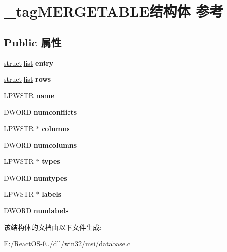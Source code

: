 \hypertarget{struct__tag_m_e_r_g_e_t_a_b_l_e}{}\section{\+\_\+tag\+M\+E\+R\+G\+E\+T\+A\+B\+L\+E结构体 参考}
\label{struct__tag_m_e_r_g_e_t_a_b_l_e}
\subsection*{Public 属性}
\begin{DoxyCompactItemize}
\item 
\mbox{\label{struct__tag_m_e_r_g_e_t_a_b_l_e_aa11b44de08a21772df241dfccb3161c1}} 
\hyperlink{interfacestruct}{struct} \hyperlink{classlist}{list} {\bfseries entry}
\item 
\mbox{\label{struct__tag_m_e_r_g_e_t_a_b_l_e_a0b328c20075d34b687b4c1938c43bcc1}} 
\hyperlink{interfacestruct}{struct} \hyperlink{classlist}{list} {\bfseries rows}
\item 
\mbox{\label{struct__tag_m_e_r_g_e_t_a_b_l_e_a4d0d827c2bd5ea1b177e4819a49bac49}} 
L\+P\+W\+S\+TR {\bfseries name}
\item 
\mbox{\label{struct__tag_m_e_r_g_e_t_a_b_l_e_a458d530cfe46c00dd3dbac17e7ac5b60}} 
D\+W\+O\+RD {\bfseries numconflicts}
\item 
\mbox{\label{struct__tag_m_e_r_g_e_t_a_b_l_e_a1a8b5fdee38a47f29556a93c656dfc4e}} 
L\+P\+W\+S\+TR $\ast$ {\bfseries columns}
\item 
\mbox{\label{struct__tag_m_e_r_g_e_t_a_b_l_e_ab895a7d3a5f6f1ed52736ce7140d8101}} 
D\+W\+O\+RD {\bfseries numcolumns}
\item 
\mbox{\label{struct__tag_m_e_r_g_e_t_a_b_l_e_ae8091e6feca03d48314c0b4b2fb4a279}} 
L\+P\+W\+S\+TR $\ast$ {\bfseries types}
\item 
\mbox{\label{struct__tag_m_e_r_g_e_t_a_b_l_e_a3077fe288d6fa8ee9f7d029a01d8a851}} 
D\+W\+O\+RD {\bfseries numtypes}
\item 
\mbox{\label{struct__tag_m_e_r_g_e_t_a_b_l_e_aa7ce7fc9e35e3aa88a52ef2f67168084}} 
L\+P\+W\+S\+TR $\ast$ {\bfseries labels}
\item 
\mbox{\label{struct__tag_m_e_r_g_e_t_a_b_l_e_aa2b256ed86bc807831f14d093e2bf25b}} 
D\+W\+O\+RD {\bfseries numlabels}
\end{DoxyCompactItemize}


该结构体的文档由以下文件生成\+:\begin{DoxyCompactItemize}
\item 
E\+:/\+React\+O\+S-\/0../dll/win32/msi/database.\+c\end{DoxyCompactItemize}
